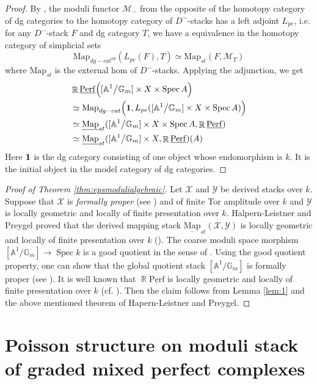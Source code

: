 \documentclass[reqno]{amsart}
\DeclareMathOperator\R{\mathbb R}
\theoremstyle{definition}
\theoremstyle{remark}
\newcommand{\G}{{\mathbb G}}
\newcommand{\A}{{\mathbb A}}
\newcommand{\ul}{\underline}
\newcommand{\Spec}{\operatorname{Spec}}
\newcommand{\uperf}{\ul{\mathrm{Perf}}}
\newcommand{\cM}{\mathcal{M}}
\newcommand{\Map}{{\mathrm{Map}}}
\newcommand{\sX}{\mathscr{X}}
\newcommand{\sY}{\mathscr{Y}}
\numberwithin{equation}{section}
\begin{document}
\begin{proof}
By \cite[Prop 3.4]{TV07}, the moduli functor $\cM_{-}$ from the opposite of the homotopy category of dg categories to the homotopy category of $D^-$-stacks has a left adjoint $L_{pe}$, i.e. for any $D^-$-stack $F$ and dg category $T$, we have a equivalence in the homotopy category of simplicial sets
\[
\Map_{dg-cat^{op}}(L_{pe}(F),T)\simeq \Map_{st}(F,\cM_T)
\] where $\Map_{st}$ is the external hom of $D^-$-stacks. Applying the adjunction, we get
\begin{align*}
&\R\uperf\Big([\A^1\big/ \G_m]\times X\times \Spec A\Big)\\
&\simeq \Map_{dg-cat}\Big({\bf{1}}, L_{pe}([\A^1\big/ \G_m]\times X\times \Spec A)\Big) \\
&\simeq \ul\Map_{st}([\A^1\big/ \G_m]\times X\times \Spec A,\R\uperf)\\
&\simeq \ul{\Map}_{st}([\A^1\big/\G_m]\times X,\R\uperf)(A)
\end{align*}
Here ${\bf{1}}$ is the dg category consisting of one object whose endomorphism is $k$. It is the initial object in the model category of dg categories.
\end{proof}

\begin{proof}[Proof of Theorem \ref{thm:epsmodulialgebraic}] 
Let $\sX$ and $\sY$ be derived stacks over $k$. Suppose that $\sX$ is \emph{formally proper} (see \cite[Definition 1.1.3]{HL-P19}) and of finite Tor amplitude over $k$ and $\sY$ is locally geometric and locally of finite presentation over $k$. Halpern-Leistner and Preygel proved that the derived mapping stack $\ul{\Map}_{st}(\sX,\sY)$ is locally geometric and locally of finite presentation over $k$ (\cite[Theorem 5.1.1]{HL-P19}). The coarse moduli space morphism $[\A^1/\G_m]\to \Spec k$ is a good quotient in the sense of \cite{Alper09}.  Using the good quotient property, one can show that the global quotient stack $[\A^1\big/\G_m]$ is formally proper (see \cite[Proposition 4.2.5]{HL-P19}). It is well known that $\R\uperf$ is locally geometric and locally of finite presentation over $k$ (cf. \cite[Proposition 3.7]{TV07}). Then the claim follows from Lemma \ref{lem:1} and the above mentioned theorem of Hapern-Leistner and Preygel.
\end{proof}

\section{Poisson structure on moduli stack of graded mixed perfect complexes}\label{sec:poisson str}
\end{document}
